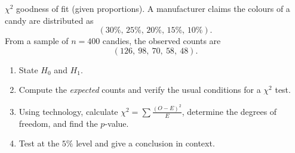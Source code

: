 \documentclass[11pt]{article}
\def\textbf#1{#1}%
\newcounter{question}
\begin{document}
\begin{question}
\textbf{$\chi^2$ goodness of fit (given proportions).}
A manufacturer claims the colours of a candy are distributed as
\[
(30\%,\,25\%,\,20\%,\,15\%,\,10\%).
\]
From a sample of $n=400$ candies, the observed counts are
\[
(126,\ 98,\ 70,\ 58,\ 48).
\]

\begin{enumerate}
  \item State $H_0$ and $H_1$.
  \item Compute the \emph{expected} counts and verify the usual conditions for a $\chi^2$ test.
  \item Using technology, calculate $\displaystyle \chi^2=\sum \frac{(O-E)^2}{E}$, determine the degrees of freedom, and find the $p$-value.
  \item Test at the $5\%$ level and give a conclusion in context.
\end{enumerate}

\begin{center}
\end{center}
\end{question}
\end{document}

